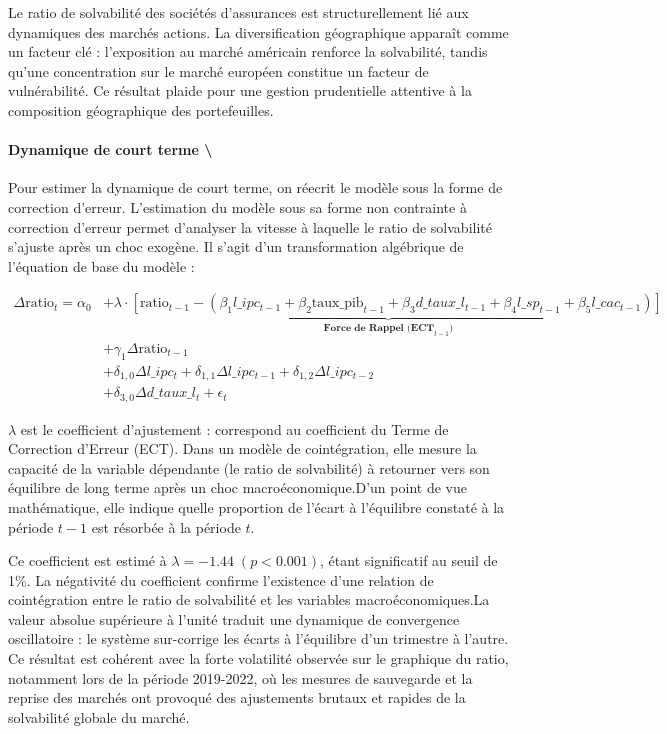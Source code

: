 \documentclass[
]{article}
\begin{document}
Le ratio de solvabilité des sociétés d'assurances est structurellement
lié aux dynamiques des marchés actions. La diversification géographique
apparaît comme un facteur clé : l'exposition au marché américain
renforce la solvabilité, tandis qu'une concentration sur le marché
européen constitue un facteur de vulnérabilité. Ce résultat plaide pour
une gestion prudentielle attentive à la composition géographique des
portefeuilles.

\paragraph{Dynamique de court terme
\textbackslash{}}\label{dynamique-de-court-terme}

Pour estimer la dynamique de court terme, on réecrit le modèle sous la
forme de correction d'erreur. L'estimation du modèle sous sa forme non
contrainte à correction d'erreur permet d'analyser la vitesse à laquelle
le ratio de solvabilité s'ajuste après un choc exogène. Il s'agit d'un
transformation algébrique de l'équation de base du modèle :

\[\begin{aligned}
\Delta \text{ratio}_t = \alpha_0 &+ \underbrace{\lambda \cdot \left[ \text{ratio}_{t-1} - \left( \beta_1 l\_ipc_{t-1} + \beta_2 \text{taux\_pib}_{t-1} + \beta_3 d\_taux\_l_{t-1} + \beta_4 l\_sp_{t-1} + \beta_5 l\_cac_{t-1} \right) \right]}_{\textbf{Force de Rappel (ECT}_{t-1}\textbf{)}} \\
&+ \gamma_{1} \Delta \text{ratio}_{t-1} \\
&+ \delta_{1,0} \Delta l\_ipc_t + \delta_{1,1} \Delta l\_ipc_{t-1} + \delta_{1,2} \Delta l\_ipc_{t-2} \\
&+ \delta_{3,0} \Delta d\_taux\_l_t + \epsilon_t
\end{aligned}\]

\(\lambda\) est le coefficient d'ajustement : correspond au coefficient
du Terme de Correction d'Erreur (ECT). Dans un modèle de cointégration,
elle mesure la capacité de la variable dépendante (le ratio de
solvabilité) à retourner vers son équilibre de long terme après un choc
macroéconomique.D'un point de vue mathématique, elle indique quelle
proportion de l'écart à l'équilibre constaté à la période \(t-1\) est
résorbée à la période \(t\).

Ce coefficient est estimé à \(\lambda = −1.44 \;(p < 0.001)\), étant
significatif au seuil de 1\%. La négativité du coefficient confirme
l'existence d'une relation de cointégration entre le ratio de
solvabilité et les variables macroéconomiques.La valeur absolue
supérieure à l'unité traduit une dynamique de convergence oscillatoire :
le système sur-corrige les écarts à l'équilibre d'un trimestre à
l'autre. Ce résultat est cohérent avec la forte volatilité observée sur
le graphique du ratio, notamment lors de la période 2019-2022, où les
mesures de sauvegarde et la reprise des marchés ont provoqué des
ajustements brutaux et rapides de la solvabilité globale du marché.
\end{document}
